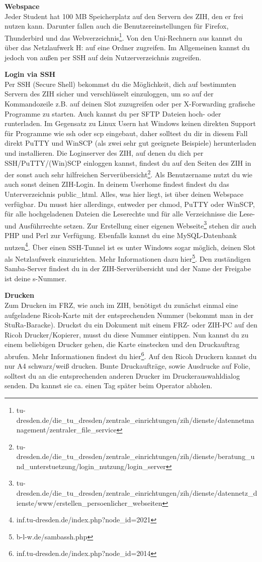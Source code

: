 \textbf{Webspace} \\
Jeder Student hat 100 MB Speicherplatz auf den Servern des ZIH, den er frei nutzen kann.
Darunter fallen auch die Benutzereinstellungen für Firefox, Thunderbird und das Webverzeichnis\footnote{tu-dresden.de/die\_tu\_dresden/zentrale\_einrichtungen/zih/dienste/datennetmanagement/zentraler\_file\_service}.
Von den Uni-Rechnern aus kannst du über das Netzlaufwerk H: auf eine Ordner zugreifen.
Im Allgemeinen kannst du jedoch von außen per SSH auf dein Nutzerverzeichnis zugreifen.

\textbf{Login via SSH} \\
Per SSH (Secure Shell) bekommst du die Möglichkeit, dich auf bestimmten Servern des ZIH sicher und verschlüsselt einzuloggen, um so auf der Kommandozeile z.B. auf deinen Slot zuzugreifen oder per X-Forwarding grafische Programme zu starten.
Auch kannst du per SFTP Dateien hoch- oder runterladen.
Im Gegensatz zu Linux Usern hat Windows keinen direkten Support für Programme wie ssh oder scp eingebaut, daher solltest du dir in diesem Fall direkt PuTTY und WinSCP (als zwei sehr gut geeignete Beispiele) herunterladen und installieren.
Die Loginserver des ZIH, auf denen du dich per SSH/PuTTY/(Win)SCP einloggen kannst, findest du auf den Seiten des ZIH in der sonst auch sehr hilfreichen Serverübersicht\footnote{tu-dresden.de/die\_tu\_dresden/zentrale\_einrichtungen/zih/dienste/beratung\_und\_unterstuetzung/login\_nutzung/login\_server}.
Als Benutzername nutzt du wie auch sonst deinen ZIH-Login.
In deinem Userhome findest findest du das Unterverzeichnis public\_html.
Alles, was hier liegt, ist über deinen Webspace verfügbar.
Du musst hier allerdings, entweder per chmod, PuTTY oder WinSCP, für alle hochgeladenen Dateien die Leserechte und für alle Verzeichnisse die Lese- und Ausführrechte setzen.
Zur Erstellung einer eigenen Webseite\footnote{tu-dresden.de/die\_tu\_dresden/zentrale\_einrichtungen/zih/dienste/datennetz\_dienste/www/erstellen\_persoenlicher\_webseiten} stehen dir auch PHP und Perl zur Verfügung.
Ebenfalls kannst du eine MySQL-Datenbank nutzen\footnote{inf.tu-dresden.de/index.php?node\_id=2021}.
Über einen SSH-Tunnel ist es unter Windows sogar möglich, deinen Slot als Netzlaufwerk einzurichten.
Mehr Informationen dazu hier\footnote{b-l-w.de/sambassh.php}.
Den zuständigen Samba-Server findest du in der ZIH-Serverübersicht und der Name der Freigabe ist deine s-Nummer.

\textbf{Drucken} \\
Zum Drucken im FRZ, wie auch im ZIH, benötigst du zunächst einmal eine aufgeladene Ricoh-Karte mit der entsprechenden Nummer (bekommt man in der StuRa-Baracke).
Druckst du ein Dokument mit einem FRZ- oder ZIH-PC auf den Ricoh Drucker/Kopierer, musst du diese Nummer eintippen.
Nun kannst du zu einem beliebigen Drucker gehen, die Karte einstecken und den Druckauftrag abrufen.
Mehr Informationen findest du hier\footnote{inf.tu-dresden.de/index.php?node\_id=2014}.
Auf den Ricoh Druckern kannst du nur A4 schwarz/weiß drucken.
Bunte Druckaufträge, sowie Ausdrucke auf Folie, solltest du an die entsprechenden anderen Drucker im Druckerauswahldialog senden.
Du kannst sie ca. einen Tag später beim Operator abholen.

